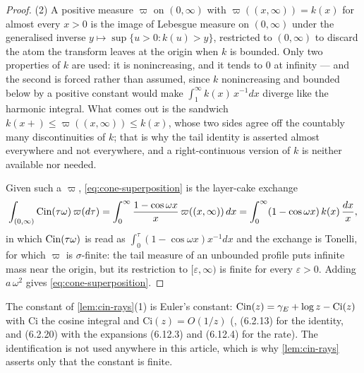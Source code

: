 \begin{proof}
(2) A positive measure $\varpi$ on $(0,\infty)$ with $\varpi((x,\infty)) = k(x)$ for almost
every $x > 0$ is the image of Lebesgue measure on $(0,\infty)$ under the generalised inverse
$y \mapsto \sup\{u > 0 : k(u) > y\}$, restricted to $(0,\infty)$ to discard the atom the
transform leaves at the origin when $k$ is bounded. Only two properties of $k$ are used: it is
nonincreasing, and it tends to $0$ at infinity --- and the second is forced rather than
assumed, since $k$ nonincreasing and bounded below by a positive constant would make
$\int_1^\infty k(x)\,x^{-1}dx$ diverge like the harmonic integral. What comes out is the
sandwich $k(x{+}) \le \varpi((x,\infty)) \le k(x)$, whose two sides agree off the countably
many discontinuities of $k$; that is why the tail identity is asserted almost everywhere and
not everywhere, and a right-continuous version of $k$ is neither available nor needed.

Given such a $\varpi$, \ref{eq:cone-superposition} is the layer-cake exchange
\[
  \int_{(0,\infty)} \operatorname{Cin}(\tau\omega)\,\varpi(d\tau)
  = \int_0^\infty \frac{1 - \cos\omega x}{x}\,\varpi((x,\infty))\,dx
  = \int_0^\infty (1 - \cos\omega x)\,k(x)\,\frac{dx}{x},
\]
in which $\operatorname{Cin}(\tau\omega)$ is read as $\int_0^\tau (1-\cos\omega x)x^{-1}dx$ and the exchange
is Tonelli, for which $\varpi$ is $\sigma$-finite: the tail measure of an unbounded profile puts
infinite mass near the origin, but its restriction to $[\varepsilon,\infty)$ is finite for every
$\varepsilon > 0$. Adding $a\,\omega^2$ gives
\ref{eq:cone-superposition}.
\end{proof}

\begin{remark}\label{rem:cin-constant}
The constant of \ref{lem:cin-rays}(1) is Euler's constant: $\operatorname{Cin}(z) = \gamma_E + \log z -
\mathrm{Ci}(z)$ with $\mathrm{Ci}$ the cosine integral and $\mathrm{Ci}(z) = O(1/z)$
(, (6.2.13) for the identity, and (6.2.20) with the expansions (6.12.3) and
(6.12.4) for the rate). The identification is not used anywhere in this article, which is
why \ref{lem:cin-rays} asserts only that the constant is finite.
\end{remark}

